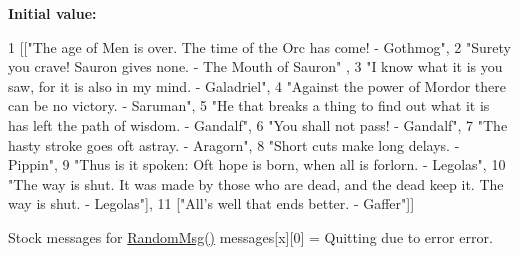 {\bfseries \-Initial value\-:}
\begin{DoxyCode}
1 [["The age of Men is over. The time of the Orc has come! - Gothmog",
2                    "Surety you crave! Sauron gives none. - The Mouth of Sauron"
      ,
3                    "I know what it is you saw, for it is also in my mind. -
       Galadriel",
4                    "Against the power of Mordor there can be no victory. -
       Saruman",
5                    "He that breaks a thing to find out what it is has left the
       path of wisdom. - Gandalf",
6                    "You shall not pass! - Gandalf",
7                    "The hasty stroke goes oft astray. - Aragorn",
8                    "Short cuts make long delays. - Pippin",
9                    "Thus is it spoken: Oft hope is born, when all is forlorn. -
       Legolas",
10                    "The way is shut. It was made by those who are dead, and the
       dead keep it. The way is shut. - Legolas"],
11                   ["All's well that ends better. - Gaffer"]]
\end{DoxyCode}


\-Stock messages for \hyperlink{namespaceutils_a17b230eb88f99a55015827768f6d5c6e}{\-Random\-Msg()} messages\mbox{[}x\mbox{]}\mbox{[}0\mbox{]} = \-Quitting due to error error. 

